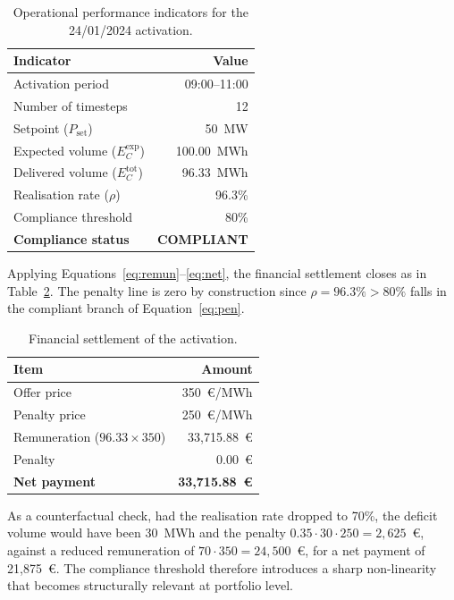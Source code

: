 \documentclass{article}
\begin{document}
\begin{table}[H]
\centering
\begin{tabular}{@{}lr@{}}
\toprule
Indicator & Value \\ \midrule
Activation period                                        & 09:00--11:00 \\
Number of timesteps                                      & 12 \\
Setpoint ($P_{\text{set}}$)                              & 50~MW \\
Expected volume ($E_C^{\text{exp}}$)                     & 100.00~MWh \\
Delivered volume ($E_C^{\text{tot}}$)                    & 96.33~MWh \\
Realisation rate ($\rho$)                                & 96.3\% \\
Compliance threshold                                     & 80\% \\ \midrule
\textbf{Compliance status}                               & \textbf{COMPLIANT} \\ \bottomrule
\end{tabular}
\caption{Operational performance indicators for the 24/01/2024 activation.}
\label{tab:kpis}
\end{table}

Applying Equations~\eqref{eq:remun}--\eqref{eq:net}, the financial settlement closes as in Table~\ref{tab:financials}. The penalty line is zero by construction since $\rho = 96.3\% > 80\%$ falls in the compliant branch of Equation~\eqref{eq:pen}.

\begin{table}[H]
\centering
\begin{tabular}{@{}lr@{}}
\toprule
Item & Amount \\ \midrule
Offer price                        & 350~\euro/MWh \\
Penalty price                      & 250~\euro/MWh \\
Remuneration ($96.33 \times 350$)  & 33{,}715.88~\euro \\
Penalty                            & 0.00~\euro \\ \midrule
\textbf{Net payment}               & \textbf{33{,}715.88~\euro} \\ \bottomrule
\end{tabular}
\caption{Financial settlement of the activation.}
\label{tab:financials}
\end{table}

As a counterfactual check, had the realisation rate dropped to 70\%, the deficit volume would have been 30~MWh and the penalty $0.35 \cdot 30 \cdot 250 = 2{,}625$~\euro{}, against a reduced remuneration of $70 \cdot 350 = 24{,}500$~\euro{}, for a net payment of 21{,}875~\euro{}. The compliance threshold therefore introduces a sharp non-linearity that becomes structurally relevant at portfolio level.
\end{document}
